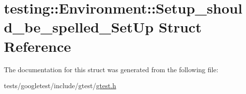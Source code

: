 \hypertarget{structtesting_1_1Environment_1_1Setup__should__be__spelled__SetUp}{}\section{testing\+:\+:Environment\+:\+:Setup\+\_\+should\+\_\+be\+\_\+spelled\+\_\+\+Set\+Up Struct Reference}
\label{structtesting_1_1Environment_1_1Setup__should__be__spelled__SetUp}


The documentation for this struct was generated from the following file\+:\begin{DoxyCompactItemize}
\item 
tests/googletest/include/gtest/\hyperlink{gtest_8h}{gtest.\+h}\end{DoxyCompactItemize}
